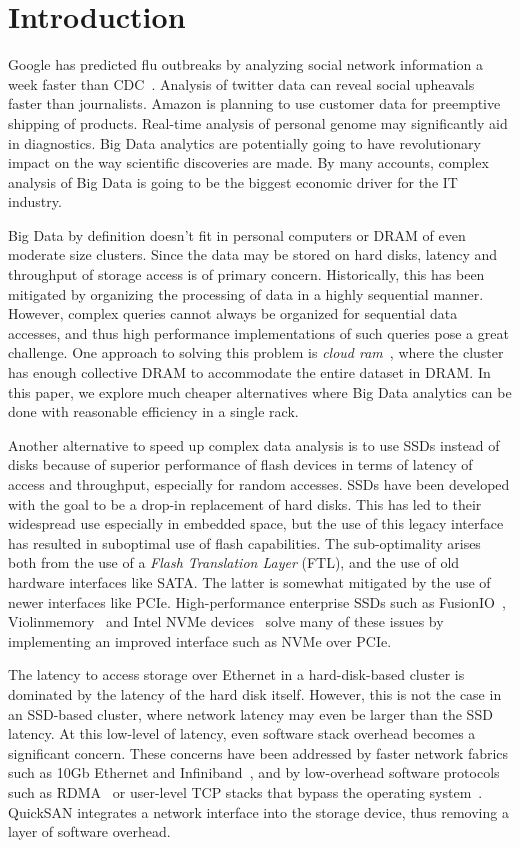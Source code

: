 \section{Introduction}

Google has predicted flu outbreaks by analyzing social network information a
week faster than CDC~\cite{}. Analysis of twitter data can reveal social
upheavals faster than journalists. Amazon is planning to use customer data for
preemptive shipping of products. Real-time analysis of personal genome may
significantly aid in diagnostics. Big Data analytics are potentially going to
have revolutionary impact on the way scientific discoveries are made. By many
accounts, complex analysis of Big Data is going to be the biggest economic
driver for the IT industry.

Big Data by definition doesn’t fit in personal computers or DRAM of even
moderate size clusters. Since the data may be stored on hard disks, latency and
throughput of storage access is of primary concern. Historically, this has been
mitigated by organizing the processing of data in a highly sequential manner.
However, complex queries cannot always be organized for sequential data
accesses, and thus high performance implementations of such queries pose a
great challenge. One approach to solving this problem is \emph{cloud
ram}~\cite{}, where the cluster has enough collective DRAM to accommodate the
entire dataset in DRAM. In this paper, we explore much cheaper alternatives
where Big Data analytics can be done with reasonable efficiency in a single
rack.

Another alternative to speed up complex data analysis is to use SSDs instead of
disks because of superior performance of flash devices in terms of latency of
access and throughput, especially for random accesses. SSDs have been developed
with the goal to be a drop-in replacement of hard disks. This has led to their
widespread use especially in embedded space, but the use of this legacy
interface has resulted in suboptimal use of flash capabilities. The
sub-optimality arises both from the use of a \emph{Flash Translation Layer}
(FTL), and the use of old hardware interfaces like SATA. The latter is somewhat
mitigated by the use of newer interfaces like PCIe.  High-performance enterprise
SSDs such as FusionIO~\cite{}, Violinmemory~\cite{} and Intel NVMe
devices~\cite{} solve many of these issues by implementing an improved interface
such as NVMe over PCIe.


The latency to access storage over Ethernet in a hard-disk-based cluster is
dominated by the latency of the hard disk itself. However, this is not the case
in an SSD-based cluster, where network latency may even be larger than the SSD
latency. At this low-level of latency, even software stack overhead becomes a
significant concern. These concerns have been addressed by faster network
fabrics such as 10Gb Ethernet and Infiniband~\cite{}, and by low-overhead
software protocols such as RDMA~\cite{} or user-level TCP stacks that bypass the
operating system~\cite{}. QuickSAN integrates a network interface into the
storage device, thus removing a layer of software overhead.


